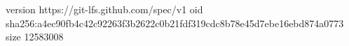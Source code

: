 version https://git-lfs.github.com/spec/v1
oid sha256:a4ec90fb4c42c92263f3b2622c0b21fdf319cdc8b78e45d7ebe16ebd874a0773
size 12583008

